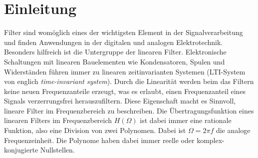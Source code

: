 \section{Einleitung}

Filter sind womöglich eines der wichtigsten Element in der Signalverarbeitung und finden Anwendungen in der digitalen und analogen Elektrotechnik.
Besonders hilfreich ist die Untergruppe der linearen Filter.
Elektronische Schaltungen mit linearen Bauelementen wie Kondensatoren, Spulen und Widerständen führen immer zu linearen zeitinvarianten Systemen (LTI-System von englich \textit{time-invariant system}).
Durch die Linearität werden beim das Filtern keine neuen Frequenzanteile erzeugt, was es erlaubt, einen Frequenzanteil eines Signals verzerrungsfrei herauszufiltern. %
Diese Eigenschaft macht es Sinnvoll, lineare Filter im Frequenzbereich zu beschreiben.
Die Übertragungsfunktion eines linearen Filters im Frequenzbereich $H(\Omega)$ ist dabei immer eine rationale Funktion, also eine Division von zwei Polynomen.
Dabei ist $\Omega = 2 \pi f$ die analoge Frequenzeinheit.
Die Polynome haben dabei immer reelle oder komplex-konjugierte Nullstellen.

